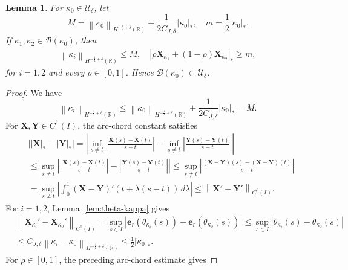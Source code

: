 \documentclass[11pt,reqno]{amsart}
\theoremstyle{plain}
\newtheorem{lemma}[theorem]{Lemma}
\theoremstyle{definition}
\numberwithin{equation}{section}
\newcommand{\paren}[1]{\left(#1\right)}
\newcommand{\mc}[1]{\mathcal{#1}}
\newcommand{\bm}[1]{\boldsymbol{#1}}
\newcommand{\abs}[1]{\left\lvert #1 \right\rvert}
\newcommand{\norm}[1]{\left\lVert #1 \right\rVert}
\newcommand{\R}{\mathbb{R}}
\newcommand{\thka}[1]{\theta_{\kappa_{#1}}}
\newcommand{\xka}[1]{\bm X_{\kappa_{#1}}}
\newcommand{\ci}[1]{C^{#1}(I)}
\newcommand{\hr}[1]{H^{#1}(\R)}
\begin{document}
\begin{lemma}\label{lem:set-ok0}
For $\kappa_0\in \mc U_\delta$, let
\begin{equation}
    M
    = \norm{\kappa_0}_{\hr{-\frac{1}{2}+\delta}}
    +\frac{1}{2C_{J,\delta}}\abs{\kappa_0}_*,
    \quad
    m = \frac{1}{2}\abs{\kappa_0}_*.
\end{equation}
If $\kappa_1,\kappa_2 \in \mc B(\kappa_0)$, then
\begin{align}\label{eqn:neighborhood-geometry}
    \norm{\kappa_i}_{\hr{-\frac{1}{2}+\delta}} \le M,
    \quad
    \abs{\rho\xka{1} + \paren{1-\rho}\xka{2}}_* \ge m,
\end{align}
for $i=1,2$ and every $\rho\in[0,1]$.
Hence $\mc B(\kappa_0)\subset\mc U_\delta$.
\end{lemma}
\begin{proof}
We have
\begin{equation}
    \norm{\kappa_i}_{\hr{-\frac{1}{2}+\delta}}
    \le \norm{\kappa_0}_{\hr{-\frac{1}{2}+\delta}}
    + \frac{1}{2C_{J,\delta}}\abs{\kappa_0}_*
    =M.
\end{equation}
For $\bm X,\bm Y\in\ci{1}$, the arc-chord constant satisfies
\begin{equation}\label{eqn:arc-chord-C1-continuity}
\begin{aligned}
    &\abs{\abs{\bm X}_* - \abs{\bm Y}_*}
    = \abs{ \inf_{s\neq t}\abs{\frac{\bm X(s)-\bm X(t)}{s-t}}
    - \inf_{s\neq t}\abs{\frac{\bm Y(s)-\bm Y(t)}{s-t}} } \\
    &\le \sup_{s\neq t}\abs{\abs{\frac{\bm X(s)-\bm X(t)}{s-t}}
    - \abs{\frac{\bm Y(s)-\bm Y(t)}{s-t}} }
    \le \sup_{s\neq t}\abs{\frac{(\bm X-\bm Y)(s)-(\bm X-\bm Y)(t)}{s-t}} \\
    &= \sup_{s\neq t}\abs{\int_0^1
    (\bm X-\bm Y)'(t+\lambda(s-t))\,d\lambda}
    \le \norm{\bm X'-\bm Y'}_{\ci{0}}.
\end{aligned}
\end{equation}
For $i=1,2$, Lemma~\ref{lem:theta-kappa} gives
\begin{equation}
\begin{aligned}
    &\norm{\xka{i}'-\xka{0}'}_{\ci{0}} = \sup_{s\in I} \abs{\bm e_r(\thka{i}(s)) - \bm e_r(\thka{0}(s))} \le \sup_{s\in I} \abs{\thka{i}(s)-\thka{0}(s)} \\
    & \le C_{J,\delta}\norm{\kappa_i-\kappa_0}_{\hr{-\frac{1}{2}+\delta}} \le \frac{1}{2}\abs{\kappa_0}_*.
\end{aligned}
\end{equation}
For $\rho\in[0,1]$, the preceding arc-chord estimate gives

\end{proof}
\end{document}

